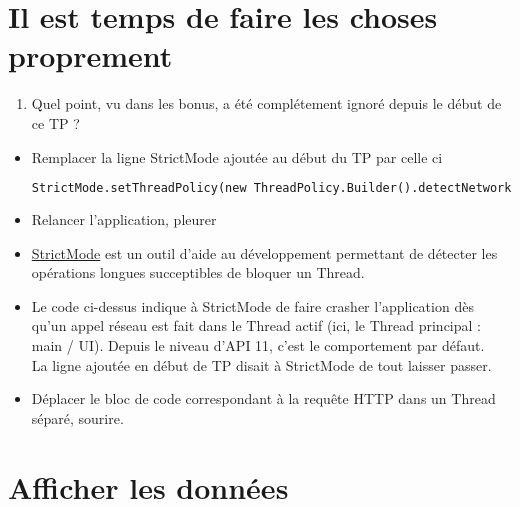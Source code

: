 \documentclass{article}
\begin{document}
\section{Il est temps de faire les choses proprement}
\begin{enumerate}
\item Quel point, vu dans les bonus, a été complétement ignoré depuis le début de ce TP ?
\end{enumerate}
\begin{itemize}
  \item Remplacer la ligne StrictMode ajoutée au début du TP par celle ci
 \begin{lstlisting}[language=XML]
 StrictMode.setThreadPolicy(new ThreadPolicy.Builder().detectNetwork().penaltyDeathOnNetwork().build());
\end{lstlisting} 
  \item Relancer l'application, pleurer
  \item
  \href{http://developer.android.com/reference/android/os/StrictMode.html}{StrictMode}
  est un outil d'aide au développement permettant de détecter les opérations
  longues succeptibles de bloquer un Thread.
  \item Le code ci-dessus indique à StrictMode de faire crasher l'application
  dès qu'un appel réseau est fait dans le Thread actif (ici, le Thread principal
  : main / UI). Depuis le niveau d'API 11, c'est le comportement par défaut.\\La
  ligne ajoutée en début de TP disait à StrictMode de tout laisser passer.
  \item Déplacer le bloc de code correspondant à la requête HTTP dans un Thread
  séparé, sourire.
\end{itemize}
\section{Afficher les données}
\end{document}
